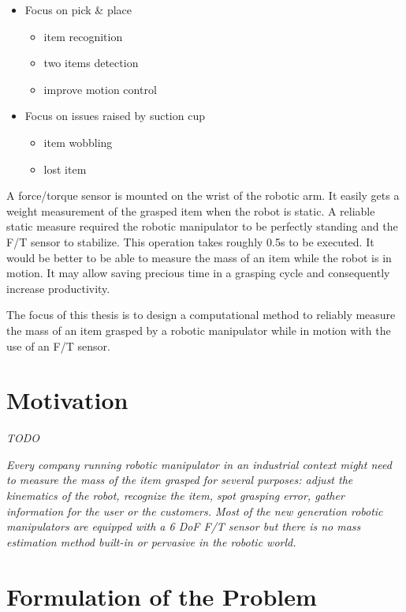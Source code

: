 \documentclass[/home/francois/latex/report/main.tex]{subfiles}
\begin{document}
{\it
\begin{itemize}
	\item Focus on pick \& place
	\begin{itemize}
		\item item recognition
		\item two items detection
		\item improve motion control
	\end{itemize}
	\item Focus on issues raised by suction cup
	\begin{itemize}
		\item item wobbling
		\item lost item
	\end{itemize}
\end{itemize}


A force/torque sensor is mounted on the wrist of the robotic arm. It easily gets a weight measurement of the grasped item when the robot is static. A reliable static measure required the robotic manipulator to be perfectly standing and the F/T sensor to stabilize. This operation takes roughly 0.5s to be executed. It would be better to be able to measure the mass of an item while the robot is in motion. It may allow saving precious time in a grasping cycle and consequently increase productivity.

The focus of this thesis is to design a computational method to reliably measure the mass of an item grasped by a robotic manipulator while in motion with the use of an F/T sensor.
}


\section{Motivation}

\textit{TODO}

{\it
Every company running robotic manipulator in an industrial context might need to measure the mass of the item grasped for several purposes: adjust the kinematics of the robot, recognize the item, spot grasping error, gather information for the user or the customers. Most of the new generation robotic manipulators are equipped with a 6 DoF F/T sensor but there is no mass estimation method built-in or pervasive in the robotic world.
}

\section{Formulation of the Problem}
\end{document}
